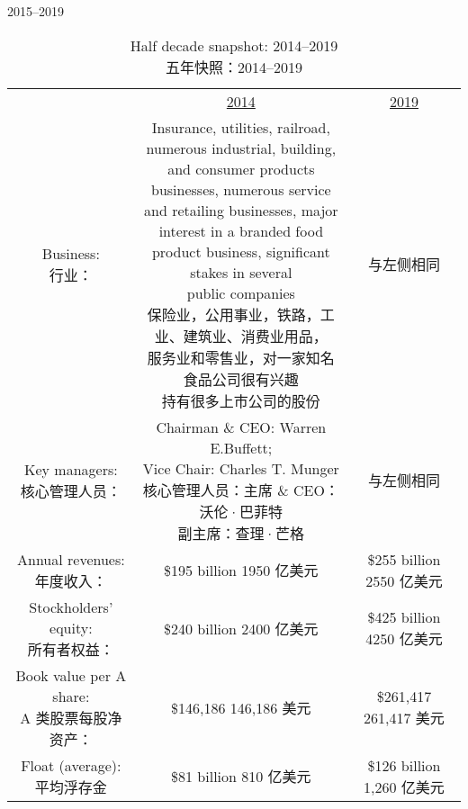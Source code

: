 \begin{chapter}{2015--2019}

\begin{table}[!htbp]
  \centering
  \begin{center}
    \hspace*{-2cm}
    \begin{tabular}{ccc}
      \toprule
       & \underline{2014} & \underline{2019} \\
      \makecell[c]{Business: \\ 行业：} & \makecell[c]{Insurance, utilities, railroad, numerous industrial, building, \\ and consumer products
      businesses, numerous service \\ and retailing businesses, major interest in a branded food \\
      product business, significant stakes in several \\ public companies \\ 保险业，公用事业，铁路，工业、建筑业、消费业用品，\\ 服务业和零售业，对一家知名食品公司很有兴趣 \\ 持有很多上市公司的股份} & 与左侧相同 \\
      \makecell[c]{Key managers: \\ 核心管理人员：} & \makecell[c]{Chairman \& CEO: Warren E.\@ Buffett; \\ Vice Chair: Charles T. Munger \\ 核心管理人员：主席 \& CEO：沃伦·巴菲特 \\ 副主席：查理·芒格} & 与左侧相同 \\
      \makecell[c]{Annual revenues: \\ 年度收入：} & \makecell[c]{\$195 billion \\ 1950 亿美元} & \makecell[c]{\$255 billion \\ 2550 亿美元} \\
      \makecell[c]{Stockholders' equity: \\ 所有者权益：} & \makecell[c]{\$240 billion \\ 2400 亿美元} & \makecell[c]{\$425 billion \\ 4250 亿美元} \\
      \makecell[c]{Book value per A share: \\ A 类股票每股净资产：} & \makecell[c]{\$146,186 \\ 146,186 美元} & \makecell[c]{\$261,417 \\ 261,417 美元} \\
      \makecell[c]{Float (average): \\ 平均浮存金} & \makecell[c]{\$81 billion \\ 810 亿美元} & \makecell[c]{\$126 billion \\ 1,260 亿美元} \\
      \bottomrule
    \end{tabular}
    \caption{Half decade snapshot: 2014--2019 \\ 五年快照：2014--2019}
  \end{center}
\end{table}


\end{chapter}
